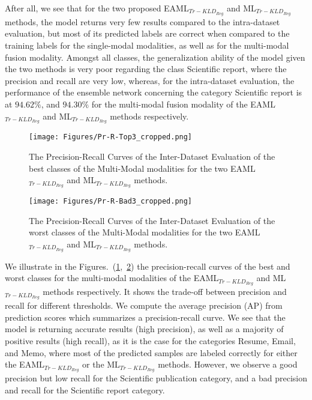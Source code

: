 \documentclass[twocolumn]{svjour3}
\begin{document}
After all, we see that for the two proposed EAML$_{{Tr-KLD}_{Reg}}$ and ML$_{{Tr-KLD}_{Reg}}$ methods, the model returns very few results compared to the intra-dataset evaluation, but most of its predicted labels are correct when compared to the training labels for the single-modal modalities, as well as for the multi-modal fusion modality.
Amongst all classes, the generalization ability of the model given the two methods is very poor regarding the class Scientific report, where the precision and recall are very low, whereas, for the intra-dataset evaluation, the performance of the ensemble network concerning the category Scientific report is at $94.62\%$, and $94.30\%$ for the multi-modal fusion modality of the EAML$_{{Tr-KLD}_{Reg}}$ and ML$_{{Tr-KLD}_{Reg}}$ methods respectively.
\begin{figure}[ht]
\centering
  \texttt{[image: Figures/Pr-R-Top3\_cropped.png]}
  \caption{The Precision-Recall Curves of the Inter-Dataset Evaluation of the best classes of the Multi-Modal modalities for the two EAML$_{{Tr-KLD}_{Reg}}$ and ML$_{{Tr-KLD}_{Reg}}$ methods.}
    \label{fig:Precision_Recall_EVAL_BEST_EAML/ML}
\end{figure}

\begin{figure}[ht]
\centering
  \texttt{[image: Figures/Pr-R-Bad3\_cropped.png]}
  \caption{The Precision-Recall Curves of the Inter-Dataset Evaluation of the worst classes of the Multi-Modal modalities for the two EAML$_{{Tr-KLD}_{Reg}}$ and ML$_{{Tr-KLD}_{Reg}}$ methods.}
   \label{fig:Precision_Recall_EVAL_WORST_EAML/ML}
\end{figure}
We illustrate in the Figures.~(\ref{fig:Precision_Recall_EVAL_BEST_EAML/ML},~\ref{fig:Precision_Recall_EVAL_WORST_EAML/ML}) the precision-recall curves of the best and worst classes for the multi-modal modalities of the EAML$_{{Tr-KLD}_{Reg}}$ and ML$_{{Tr-KLD}_{Reg}}$ methods respectively. It shows the trade-off between precision and recall for different thresholds. We compute the average precision (AP) from prediction scores which summarizes a precision-recall curve. We see that the model is returning accurate results (high precision), as well as a majority of positive results (high recall), as it is the case for the categories Resume, Email, and Memo, where most of the predicted samples are labeled correctly for either the EAML$_{{Tr-KLD}_{Reg}}$ or the ML$_{{Tr-KLD}_{Reg}}$ methods. However, we observe a good precision but low recall for the Scientific publication category, and a bad precision and recall for the Scientific report category.
\end{document}
